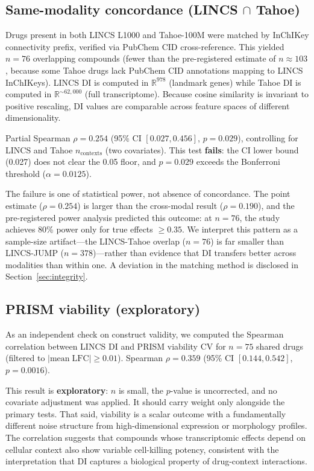 \documentclass[11pt]{article}
\begin{document}
\subsection{Same-modality concordance (LINCS \texorpdfstring{$\cap$}{∩} Tahoe)}

Drugs present in both LINCS L1000 and Tahoe-100M were matched by
InChIKey connectivity prefix, verified via PubChem CID cross-reference.
This yielded $n = 76$ overlapping compounds (fewer than the
pre-registered estimate of $n \approx 103$, because some Tahoe drugs
lack PubChem CID annotations mapping to LINCS InChIKeys).  LINCS DI is
computed in $\mathbb{R}^{978}$ (landmark genes) while Tahoe DI is
computed in $\mathbb{R}^{\sim 62{,}000}$ (full transcriptome).  Because
cosine similarity is invariant to positive rescaling, DI values are
comparable across feature spaces of different dimensionality.

Partial Spearman $\rho = 0.254$ (95\% CI $[0.027, 0.456]$,
$p = 0.029$), controlling for LINCS and Tahoe $n_{\mathrm{contexts}}$
(two covariates).  This test \textbf{fails}: the CI lower bound
(0.027) does not clear the 0.05 floor, and $p = 0.029$ exceeds the
Bonferroni threshold ($\alpha = 0.0125$).

The failure is one of statistical power, not absence of concordance.
The point estimate ($\rho = 0.254$) is larger than the cross-modal result
($\rho = 0.190$), and the pre-registered power analysis predicted this
outcome: at $n = 76$, the study achieves 80\% power only for true
effects $\geq 0.35$.  We interpret this pattern as a sample-size
artifact---the LINCS-Tahoe overlap ($n = 76$) is far smaller than
LINCS-JUMP ($n = 378$)---rather than evidence that DI transfers better
across modalities than within one.  A deviation in the matching method
is disclosed in Section~\ref{sec:integrity}.

\subsection{PRISM viability (exploratory)}

As an independent check on construct validity, we computed the Spearman
correlation between LINCS DI and PRISM viability CV for $n = 75$ shared
drugs (filtered to $|\mathrm{mean\;LFC}| \geq 0.01$).  Spearman
$\rho = 0.359$ (95\% CI $[0.144, 0.542]$, $p = 0.0016$).

This result is \textbf{exploratory}: $n$ is small, the $p$-value is
uncorrected, and no covariate adjustment was applied.  It should carry
weight only alongside the primary tests.  That said, viability is a
scalar outcome with a fundamentally different noise structure from
high-dimensional expression or morphology profiles.  The correlation
suggests that compounds whose transcriptomic effects depend on cellular
context also show variable cell-killing potency, consistent with the
interpretation that DI captures a biological property of drug-context
interactions.
\end{document}
